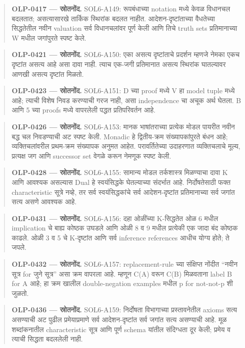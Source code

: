 \begin{quote}\small\textbf{OLP-0417 — स्रोतनोंद.} SOL6-A149: रूपबंधाच्या notation मध्ये केवळ विधानचल बदलतात; असत्यासारखे तार्किक स्थिरांक बदलत नाहीत. आदेशन-दृष्टांताच्या वैधतेच्या सिद्धतेतील नवीन valuation सर्व विधानचलांवर पूर्ण केली आणि तिचे truth sets प्रतिमानाच्या W मधील जगांपुरते स्पष्ट केले.\end{quote}
\begin{quote}\small\textbf{OLP-0421 — स्रोतनोंद.} SOL6-A150: एका असत्य दृष्टांताचे प्रदर्शन म्हणजे नेमका एकच दृष्टांत असत्य आहे असा दावा नाही. त्याच एक-जगी प्रतिमानात असत्य स्थिरांक घातल्यावर आणखी असत्य दृष्टांत मिळतो.\end{quote}
\begin{quote}\small\textbf{OLP-0423 — स्रोतनोंद.} SOL6-A151: D च्या proof मध्ये V हा model tuple मध्ये आहे; त्याची विशेष निवड करण्याची गरज नाही, असा independence चा अचूक अर्थ घेतला. B आणि 5 च्या proofs मध्ये वापरलेली पद्धत प्रतिपरिवर्तन आहे.\end{quote}
\begin{quote}\small\textbf{OLP-0426 — स्रोतनोंद.} SOL6-A153: मानक भाषांतराच्या प्रत्येक मोडल पायरीत नवीन बद्ध चल निवडण्याची अट स्पष्ट केली. Monadic हे द्वितीय-क्रम संख्यापकांपुरते बंधन आहे; व्यक्तिचलांवरील प्रथम-क्रम संख्यापक अनुमत आहेत. परावर्तितेच्या उदाहरणात व्यक्तिचलाचे मूल्य, प्रत्यक्ष जग आणि successor set वेगळे करून नेमणूक स्पष्ट केली.\end{quote}
\begin{quote}\small\textbf{OLP-0428 — स्रोतनोंद.} SOL6-A155: सामान्य मोडल तर्कशास्त्र मिळण्याचा दावा K आणि आवश्यक असल्यास Dual हे स्वयंसिद्धके घेतल्याच्या संदर्भात आहे. निर्दोषतेसाठी फक्त characteristic सूत्रे नव्हे, तर सर्व स्वयंसिद्धकांचे सर्व आदेशन-दृष्टांत प्रतिमानाच्या सर्व जगांत सत्य असणे आवश्यक आहे.\end{quote}
\begin{quote}\small\textbf{OLP-0431 — स्रोतनोंद.} SOL6-A156: दहा ओळींच्या K-सिद्धतेत ओळ 6 मधील implication चे बाह्य कोष्ठक उघडले आणि ओळी 8 व 9 मधील प्रत्येकी एक जादा बंद कोष्ठक काढले. ओळी 3 व 5 चे K-दृष्टांत आणि सर्व inference references आधीच योग्य होते; ते जपले.\end{quote}
\begin{quote}\small\textbf{OLP-0432 — स्रोतनोंद.} SOL6-A157: replacement-rule च्या संक्षिप्त नोंदीत “नवीन सूत्र for जुने सूत्र” असा क्रम वापरला आहे. म्हणून C(A) वरून C(B) मिळवताना label B for A आहे; हा क्रम खालील double-negation examples मधील p for not-not-p शी जुळतो.\end{quote}
\begin{quote}\small\textbf{OLP-0436 — स्रोतनोंद.} SOL6-A159: निर्दोषता विभागाच्या प्रस्तावनेतील axioms सत्य असण्याची अट पुढील प्रमेयाप्रमाणे सर्व आदेशन-दृष्टांत सर्व जगांत सत्य असण्याची आहे. मूळ शब्दांकनातील characteristic सूत्र आणि पूर्ण schema यांतील संदिग्धता दूर केली; प्रमेय व त्याची सिद्धता बदललेली नाही.\end{quote}

